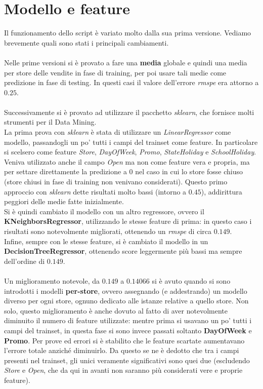 \section*{Modello e feature}

Il funzionamento dello script è variato molto dalla sua prima versione. Vediamo brevemente quali sono stati i principali cambiamenti.\\
\\
Nelle prime versioni si è provato a fare una \textbf{media} globale e quindi una media per store delle vendite in fase di training, per poi usare tali medie come predizione in fase di testing. In questi casi il valore dell'errore \textit{rmspe} era attorno a $0.25$.\\
\\
Successivamente si è provato ad utilizzare il pacchetto \textit{sklearn}, che fornisce molti strumenti per il Data Mining.\\
La prima prova con \textit{sklearn} è stata di utilizzare un \textit{LinearRegressor} come modello, passandogli un po' tutti i campi del trainset come feature. In particolare si scelsero come feature \textit{Store}, \textit{DayOfWeek}, \textit{Promo}, \textit{StateHoliday} e \textit{SchoolHoliday}. Veniva utilizzato anche il campo \textit{Open} ma non come feature vera e propria, ma per settare direttamente la predizione a $0$ nel caso in cui lo store fosse chiuso (store chiusi in fase di training non venivano considerati). Questo primo approccio con \textit{sklearn} dette risultati molto bassi (intorno a $0.45$), addirittura peggiori delle medie fatte inizialmente.\\
Si è quindi cambiato il modello con un altro regressore, ovvero il \textbf{KNeighborsRegressor}, utilizzando le stesse feature di prima: in questo caso i risultati sono notevolmente migliorati, ottenendo un \textit{rmspe} di circa $0.149$.\\
Infine, sempre con le stesse feature, si è cambiato il modello in un \textbf{DecisionTreeRegressor}, ottenendo score leggermente più bassi ma sempre dell'ordine di $0.149$.\\
\\
Un miglioramento notevole, da $0.149$ a $0.14066$ si è avuto quando si sono introdotti i modelli \textbf{per-store}, ovvero assegnando (e addestrando) un modello diverso per ogni store, ognuno dedicato alle istanze relative a quello store. Non solo, questo miglioramento è anche dovuto al fatto di aver notevolmente diminuito il numero di feature utilizzate: mentre prima si usavano un po' tutti i campi del trainset, in questa fase si sono invece passati soltanto \textbf{DayOfWeek} e \textbf{Promo}. Per prove ed errori si è stabilito che le feature scartate aumentavano l'errore totale anziché diminuirlo. Da questo se ne è dedotto che tra i campi presenti nel trainset, gli unici veramente significativi sono quei due (escludendo \textit{Store} e \textit{Open}, che da qui in avanti non saranno più considerati vere e proprie feature).\\
